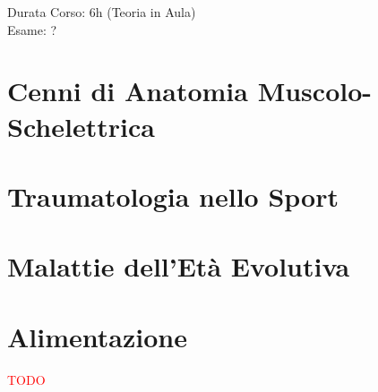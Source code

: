 \documentclass[../uefaC.tex]{subfiles}
\begin{document}

Durata Corso: 6h (Teoria in Aula) \hfill \\
Esame: ?

\section{Cenni di Anatomia Muscolo-Schelettrica}

\section{Traumatologia nello Sport}

\section{Malattie dell'Età Evolutiva}

\section{Alimentazione}

\textcolor{red}{TODO}
\end{document}
